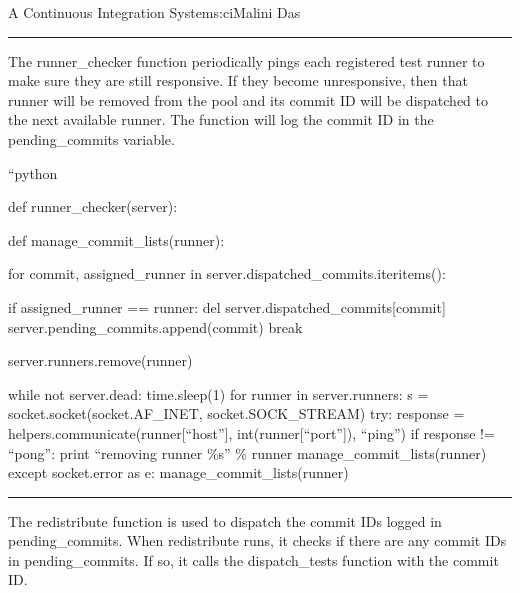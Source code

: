 \begin{aosachapter}{A Continuous Integration System}{s:ci}{Malini Das}
\begin{center}\rule{3in}{0.4pt}\end{center}

The runner\_checker function periodically pings each registered test
runner to make sure they are still responsive. If they become
unresponsive, then that runner will be removed from the pool and its
commit ID will be dispatched to the next available runner. The function
will log the commit ID in the pending\_commits variable.

\begin{aosadescription}
\item[``python]
\begin{aosadescription}
\item[def runner\_checker(server):]
\begin{aosadescription}
\item[def manage\_commit\_lists(runner):]
\begin{aosadescription}
\item[for commit, assigned\_runner in
server.dispatched\_commits.iteritems():]
\begin{aosadescription}

\item[if assigned\_runner == runner:]
del server.dispatched\_commits{[}commit{]}
server.pending\_commits.append(commit) break
\end{aosadescription}
\end{aosadescription}

server.runners.remove(runner)
\item[while not server.dead:]
time.sleep(1) for runner in server.runners: s =
socket.socket(socket.AF\_INET, socket.SOCK\_STREAM) try: response =
helpers.communicate(runner{[}``host''{]}, int(runner{[}``port''{]}),
``ping'') if response != ``pong'': print ``removing runner \%s'' \%
runner manage\_commit\_lists(runner) except socket.error as e:
manage\_commit\_lists(runner)
\end{aosadescription}
\end{aosadescription}
\end{aosadescription}

\begin{center}\rule{3in}{0.4pt}\end{center}

The redistribute function is used to dispatch the commit IDs logged in
pending\_commits. When redistribute runs, it checks if there are any
commit IDs in pending\_commits. If so, it calls the dispatch\_tests
function with the commit ID.


\end{aosachapter}

